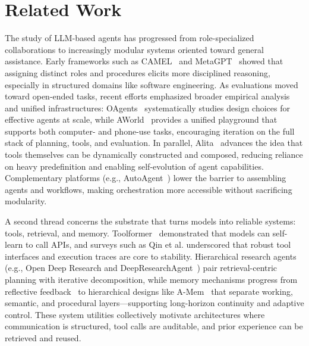 \section{Related Work}
\label{sec:related}

The study of LLM-based agents has progressed from role-specialized collaborations to increasingly modular systems oriented toward general assistance. Early frameworks such as CAMEL~\cite{li2023camel} and MetaGPT~\cite{hong2024metagpt} showed that assigning distinct roles and procedures elicits more disciplined reasoning, especially in structured domains like software engineering. As evaluations moved toward open-ended tasks, recent efforts emphasized broader empirical analysis and unified infrastructures: OAgents~\cite{oagent} systematically studies design choices for effective agents at scale, while AWorld~\cite{aworld2025} provides a unified playground that supports both computer- and phone-use tasks, encouraging iteration on the full stack of planning, tools, and evaluation. In parallel, Alita~\cite{qiu2025alita} advances the idea that tools themselves can be dynamically constructed and composed, reducing reliance on heavy predefinition and enabling self-evolution of agent capabilities. Complementary platforms (e.g., AutoAgent~\cite{tang2025autoagent}) lower the barrier to assembling agents and workflows, making orchestration more accessible without sacrificing modularity.

A second thread concerns the substrate that turns models into reliable systems: tools, retrieval, and memory. Toolformer~\cite{schick2023toolformer} demonstrated that models can self-learn to call APIs, and surveys such as Qin et al.\cite{qin2024tool} underscored that robust tool interfaces and execution traces are core to stability. Hierarchical research agents (e.g., Open Deep Research\cite{opendeepresearch} and DeepResearchAgent~\cite{DeepResearchAgent}) pair retrieval-centric planning with iterative decomposition, while memory mechanisms progress from reflective feedback~\cite{shinn2023reflexionlanguageagentsverbal} to hierarchical designs like A-Mem~\cite{xu2025mem} that separate working, semantic, and procedural layers—supporting long-horizon continuity and adaptive control. These system utilities collectively motivate architectures where communication is structured, tool calls are auditable, and prior experience can be retrieved and reused.

